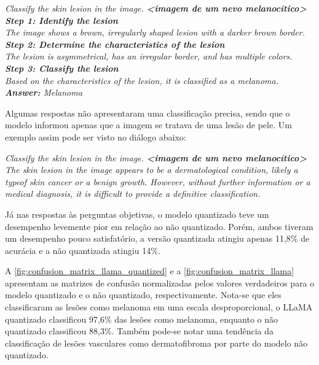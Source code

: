 \begin{dialogue}
     \textit{Classify the skin lesion in the image. \textbf{<imagem de um nevo melanocítico>}} \\
     \textit{\textbf{Step 1: Identify the lesion} \\
        The image shows a brown, irregularly shaped lesion with a darker brown border. \\
        \textbf{Step 2: Determine the characteristics of the lesion} \\
        The lesion is asymmetrical, has an irregular border, and has multiple colors. \\
        \textbf{Step 3: Classify the lesion} \\
        Based on the characteristics of the lesion, it is classified as a melanoma. \\
        \textbf{Answer:} Melanoma}
\end{dialogue}

Algumas respostas não apresentaram uma classificação precisa, sendo que o modelo informou apenas que a imagem se tratava de uma lesão de pele. Um exemplo assim pode ser
visto no diálogo abaixo:

\begin{dialogue}
     \textit{Classify the skin lesion in the image. \textbf{<imagem de um nevo melanocítico>}} \\
     \textit{The skin lesion in the image appears to be a dermatological condition, likely a typeof skin cancer or a benign growth. However, without
        further information or a medical diagnosis, it is difficult to provide a definitive classification.}
\end{dialogue}

Já nas respostas às perguntas objetivas, o modelo quantizado teve um desempenho levemente pior em relação ao não quantizado. Porém, ambos tiveram um desempenho pouco
satisfatório, a versão quantizada atingiu apenas 11,8\% de acurácia e a não quantizada atingiu 14\%.

A \autoref{fig:confusion_matrix_llama_quantized} e a \autoref{fig:confusion_matrix_llama} apresentam as matrizes de confusão normalizadas pelos valores verdadeiros para
o modelo quantizado e o não quantizado, respectivamente. Nota-se que eles classificaram as lesões como melanoma em uma escala desproporcional, o \ac{LLaMA} quantizado
classificou 97,6\% das lesões como melanoma, enquanto o não quantizado classificou 88,3\%. Também pode-se notar uma tendência da classificação de lesões vasculares como
dermatofibroma por parte do modelo não quantizado.

